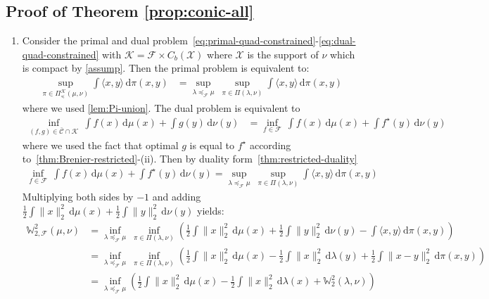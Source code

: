 \documentclass[10pt]{article}
\newcommand{\ud}{\,\mathrm{d}}
\newcommand{\norm}[1]{\|#1\|}
\newcommand{\W}{\mathds{W}}
\newcommand{\calC}{\mathcal{C}}
\newcommand{\calF}{\mathcal{F}}
\newcommand{\calK}{\mathcal{K}}
\newcommand{\calX}{\mathcal{X}}
\numberwithin{equation}{section}
\begin{document}
\subsection{Proof of Theorem \ref{prop:conic-all}}\label{app:proof-prop:conic-all}
\begin{enumerate}
	\item Consider the primal and dual problem~\eqref{eq:primal-quad-constrained}-\eqref{eq:dual-quad-constrained} with $\calK = \calF \times C_b(\calX)$ where $\calX$ is the support of $\nu$ which is compact by \autoref{assump}. Then the primal problem is equivalent to:
		\begin{align*}
	\sup_{\pi \in \Pi^\calK_\preceq(\mu,\nu)} \int \langle x,y \rangle\ud \pi(x,y)&= \sup_{\lambda \preceq_{\calF}\mu } ~\sup_{\pi \in \Pi(\lambda,\nu)} \int \langle x,y \rangle \ud \pi(x,y)
	\end{align*}
	where we used \autoref{lem:Pi-union}. The dual problem is equivalent to
	\begin{align*}
\inf_{(f,g) \in \bar{\calC} \cap \calK}~\int f(x) \ud \mu(x) + \int g (y)\ud \nu(y) &= \inf_{f \in \calF }~\int f(x) \ud \mu(x) + \int f^\star (y)\ud \nu(y)
\end{align*}
where we used the fact that optimal $g$ is equal to $f^\star$ according to~\autoref{thm:Brenier-restricted}-(ii). Then by duality form~\autoref{thm:restricted-duality}
\begin{align*}
\inf_{f \in \calF }~\int f(x) \ud \mu(x) + \int f^\star (y)\ud \nu(y)= \sup_{\lambda \preceq_{\calF}\mu } ~\sup_{\pi \in \Pi(\lambda,\nu)} \int \langle x,y \rangle \ud \pi(x,y)
\end{align*} 
Multiplying both sides by $-1$ and adding $ \frac{1}{2}\int \norm{x}_2^2 \ud \mu(x) + \frac{1}{2}\int \norm{y}_2^2 \ud \nu(y) $ yields:
\begin{align*}
 \W_{2,\calF}^2(\mu,\nu) &= \inf_{\lambda \preceq_{\calF}\mu } ~\inf_{\pi \in \Pi(\lambda,\nu)}\left(\frac{1}{2}\int \norm{x}_2^2 \ud \mu(x) + \frac{1}{2}\int \norm{y}_2^2 \ud \nu(y) - \int \langle x,y \rangle \ud \pi(x,y) \right)\\
 &=\inf_{\lambda \preceq_{\calF}\mu } ~\inf_{\pi \in \Pi(\lambda,\nu)}\left(\frac{1}{2}\int \norm{x}_2^2 \ud \mu(x) - \frac{1}{2}\int \norm{x}_2^2 \ud \lambda (y) + \frac{1}{2}\int \norm{x-y}_2^2\ud \pi(x,y) \right)\\
& = \inf_{\lambda \preceq_{\calF}\mu } \left(\frac{1}{2}\int \norm{x}_2^2 \ud \mu(x) - \frac{1}{2}\int \norm{x}_2^2 \ud \lambda (x) + \W^2_2(\lambda,\nu) \right)
\end{align*} 

\end{enumerate}
\end{document}
